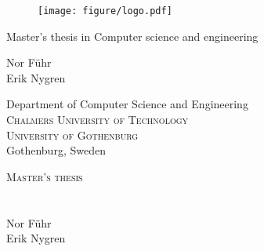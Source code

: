 {\begin{titlepage}
\begin{figure}[H]
\centering
\vspace{1cm} %
\texttt{[image: figure/logo.pdf]}
\end{figure}

\mbox{}
\vfill
\renewcommand{\familydefault}{\sfdefault} \normalfont %

\textbf{\Huge \multiLineTitle{0.2cm}}

\vspace{1cm}

{\Large \oneLineSubtitle}

\vspace{1cm}

Master's thesis in Computer science and engineering \setlength{\parskip}{1cm}

{\Large Nor Führ\\Erik Nygren} \setlength{\parskip}{2.9cm}

Department of Computer Science and Engineering \\
\textsc{Chalmers University of Technology} \\
\textsc{University of Gothenburg} \\
Gothenburg, Sweden \the\year

\renewcommand{\familydefault}{\rmdefault} \normalfont %
\restoregeometry
\end{titlepage}


\cleardoublepage


\thispagestyle{empty}
\begin{center}
  \textsc{\large Master's thesis \the\year}\\[4cm] %
  \textbf{\Large \multiLineTitle{0.2cm}} \\[1cm]
  {\large \oneLineSubtitle}\\[1cm]
  {\large Nor Führ\\Erik Nygren}


\end{center}}
